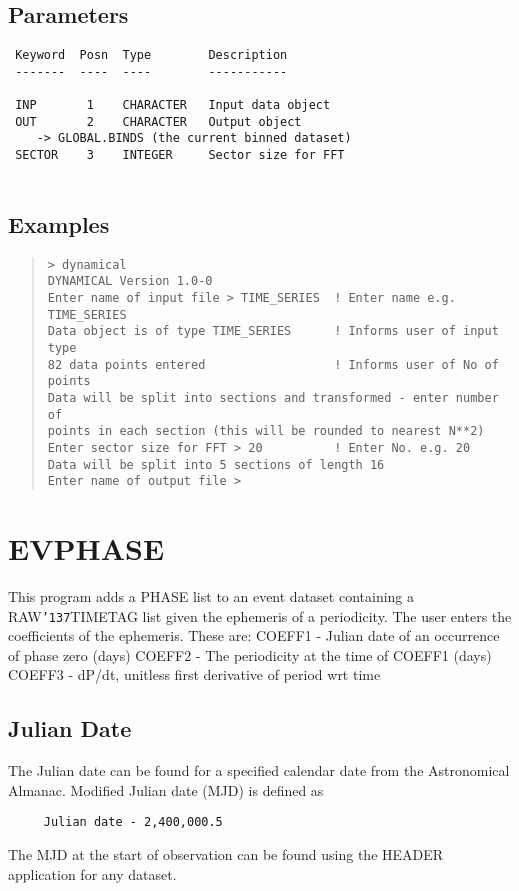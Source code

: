 \documentclass{book}
\renewcommand{\_}{{\tt\char'137}}     %
\begin{document}
\subsection{Parameters}
\begin{verbatim}
 Keyword  Posn  Type        Description
 -------  ----  ----        -----------
 
 INP       1    CHARACTER   Input data object
 OUT       2    CHARACTER   Output object
    -> GLOBAL.BINDS (the current binned dataset)
 SECTOR    3    INTEGER     Sector size for FFT
 
\end{verbatim}\subsection{Examples}
\begin{quote}\begin{verbatim}
> dynamical
DYNAMICAL Version 1.0-0
Enter name of input file > TIME_SERIES  ! Enter name e.g. TIME_SERIES
Data object is of type TIME_SERIES      ! Informs user of input type
82 data points entered                  ! Informs user of No of points
Data will be split into sections and transformed - enter number of
points in each section (this will be rounded to nearest N**2)
Enter sector size for FFT > 20          ! Enter No. e.g. 20
Data will be split into 5 sections of length 16
Enter name of output file >
\end{verbatim}\end{quote}
\section{EVPHASE}
This program adds a PHASE list to an event dataset containing
a RAW\_TIMETAG list given the ephemeris of a periodicity.
The user enters the coefficients of the ephemeris. These are:
COEFF1 - Julian date of an occurrence of phase zero (days)
COEFF2 - The periodicity at the time of COEFF1 (days)
COEFF3 - dP/dt, unitless first derivative of period wrt time
\subsection{Julian Date}
The Julian date can be found for a specified calendar date from the
Astronomical Almanac. Modified Julian date (MJD) is defined as
\begin{verbatim}
     Julian date - 2,400,000.5
\end{verbatim}
The MJD at the start of observation can be found using the HEADER
application for any dataset.
 
\end{document}

